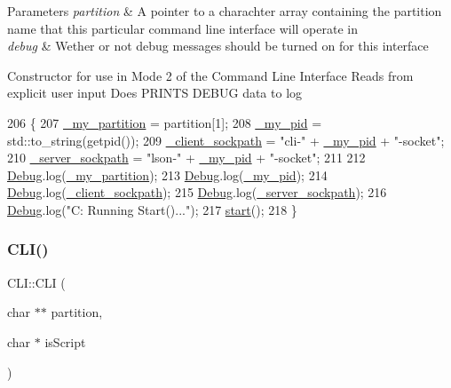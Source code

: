 \begin{DoxyParams}{Parameters}
{\em partition} & A pointer to a charachter array containing the partition name that this particular command line interface will operate in\\
\hline
{\em debug} & Wether or not debug messages should be turned on for this interface\\
\hline
\end{DoxyParams}
Constructor for use in Mode 2 of the Command Line Interface Reads from explicit user input Does P\+R\+I\+N\+TS D\+E\+B\+UG data to log 
\begin{DoxyCode}
206 \{
207   \mbox{\hyperlink{class_c_l_i_aa58101a66621f7b2b64d4e566ad7bd89}{\_my\_partition}} = partition[1];
208   \mbox{\hyperlink{class_c_l_i_a589aa7edb9b2454720d5b54af3ddea00}{\_my\_pid}} = std::to\_string(getpid());
209   \mbox{\hyperlink{class_c_l_i_ad3b7579608f8c2e1d4c01a8668f701d9}{\_client\_sockpath}} = \textcolor{stringliteral}{"cli-"} + \mbox{\hyperlink{class_c_l_i_a589aa7edb9b2454720d5b54af3ddea00}{\_my\_pid}} + \textcolor{stringliteral}{"-socket"};
210   \mbox{\hyperlink{class_c_l_i_a582f907a9e5dc5c0dcd264e2f1b14f76}{\_server\_sockpath}} = \textcolor{stringliteral}{"lson-"} + \mbox{\hyperlink{class_c_l_i_a589aa7edb9b2454720d5b54af3ddea00}{\_my\_pid}} + \textcolor{stringliteral}{"-socket"};
211 
212   \mbox{\hyperlink{_cli_8h_ab6d95a4e6a59b4ad033ed3af31d878e0}{Debug}}.log(\mbox{\hyperlink{class_c_l_i_aa58101a66621f7b2b64d4e566ad7bd89}{\_my\_partition}});
213   \mbox{\hyperlink{_cli_8h_ab6d95a4e6a59b4ad033ed3af31d878e0}{Debug}}.log(\mbox{\hyperlink{class_c_l_i_a589aa7edb9b2454720d5b54af3ddea00}{\_my\_pid}});
214   \mbox{\hyperlink{_cli_8h_ab6d95a4e6a59b4ad033ed3af31d878e0}{Debug}}.log(\mbox{\hyperlink{class_c_l_i_ad3b7579608f8c2e1d4c01a8668f701d9}{\_client\_sockpath}});
215   \mbox{\hyperlink{_cli_8h_ab6d95a4e6a59b4ad033ed3af31d878e0}{Debug}}.log(\mbox{\hyperlink{class_c_l_i_a582f907a9e5dc5c0dcd264e2f1b14f76}{\_server\_sockpath}});
216   \mbox{\hyperlink{_cli_8h_ab6d95a4e6a59b4ad033ed3af31d878e0}{Debug}}.log(\textcolor{stringliteral}{"C: Running Start()..."});
217   \mbox{\hyperlink{class_c_l_i_a1492005f186392031bd4d447cb20e975}{start}}();
218 \}
\end{DoxyCode}
\mbox{\label{class_c_l_i_a4eb5e9a1c695edf4dcc705b9c12a0a8d}} 
\subsubsection{\texorpdfstring{C\+L\+I()}{CLI()}\hspace{0.1cm}{\footnotesize\ttfamily [3/4]}}
{\footnotesize\ttfamily C\+L\+I\+::\+C\+LI (\begin{DoxyParamCaption}\item[{char $\ast$$\ast$}]{partition,  }\item[{char $\ast$}]{is\+Script }\end{DoxyParamCaption})}


